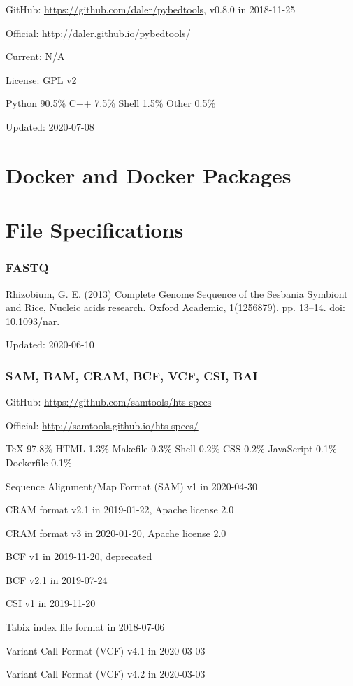 \documentclass[]{article}
\begin{document}
GitHub: \url{https://github.com/daler/pybedtools}, v0.8.0 in 2018-11-25

Official: \url{http://daler.github.io/pybedtools/}

Current: N/A

License: GPL v2

Python 90.5\% C++ 7.5\% Shell 1.5\% Other 0.5\%

Updated: 2020-07-08

\part{Docker and Docker Packages}

\part{File Specifications}
\section{FASTQ}

Rhizobium, G. E. (2013) Complete Genome Sequence of the Sesbania Symbiont and Rice, Nucleic acids research. Oxford Academic, 1(1256879), pp. 13–14. doi: 10.1093/nar.

Updated: 2020-06-10


\section{SAM, BAM, CRAM, BCF, VCF, CSI, BAI}

GitHub: \url{https://github.com/samtools/hts-specs}

Official: \url{http://samtools.github.io/hts-specs/}

TeX 97.8\% HTML 1.3\% Makefile 0.3\% Shell 0.2\% CSS 0.2\% JavaScript 0.1\% Dockerfile 0.1\% 

Sequence Alignment/Map Format (SAM) v1 in 2020-04-30

CRAM format v2.1 in 2019-01-22, Apache license 2.0

CRAM format v3 in 2020-01-20, Apache license 2.0

BCF v1 in 2019-11-20, deprecated

BCF v2.1 in 2019-07-24

CSI v1 in 2019-11-20

Tabix index file format in 2018-07-06

Variant Call Format (VCF) v4.1 in 2020-03-03

Variant Call Format (VCF) v4.2 in 2020-03-03
\end{document}
